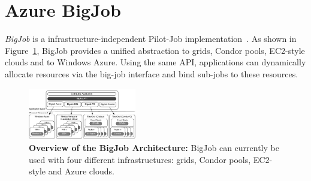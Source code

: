 \documentclass[conference,final]{IEEEtran}
\newcommand{\up}{\vspace*{-1em}}
\begin{document}
\up
\section{Azure BigJob}
\label{sec:bigjob-saga}
\up


\emph{BigJob} is a infrastructure-independent Pilot-Job implementation~\cite{10.1109/CCGRID.2010.91}.
As shown in Figure~\ref{fig:figures_distributed_pilot_job}, BigJob 
provides a unified abstraction to grids, Condor pools,
EC2-style clouds and to Windows Azure. Using the same API, applications 
can dynamically allocate resources via the big-job interface and 
bind sub-jobs to these resources. 

\begin{figure}[t]
    \centering
        \includegraphics[width=0.42\textwidth]{figures/distributed_pilot_job}
        \caption{\textbf{Overview of the BigJob Architecture:} BigJob can 
        currently be used with four different infrastructures: grids, Condor pools, 
        EC2-style and Azure clouds.\up}
    \label{fig:figures_distributed_pilot_job}
\end{figure}


\end{document}
